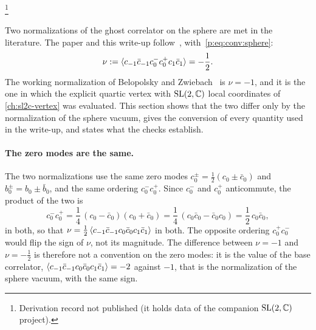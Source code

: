 \footnote{Derivation record not published (it holds data of the companion $\mathrm{SL}(2, \mathbb{C})$ project).}

Two normalizations of the ghost correlator on the sphere are met in the literature.
The paper and this write-up follow~\cite{Erbin:2021:StringFieldTheory}, with~\eqref{p:eq:conv:sphere}:
\begin{equation}
  \label{eq:conv:nu-book}
  \nu
    := \braket{c_{-1} \bar c_{-1} c_0^- c_0^+ c_1 \bar c_1}
    = - \frac{1}{2}.
\end{equation}
The working normalization of Belopolsky and Zwiebach~\cite{Belopolsky:1995:OffshellClosedString} is $\nu = -1$, and it is the one in which the explicit quartic vertex with $\mathrm{SL}(2, \mathbb{C})$ local coordinates of \cref{ch:sl2c-vertex} was evaluated.
This section shows that the two differ only by the normalization of the sphere vacuum, gives the conversion of every quantity used in the write-up, and states what the checks establish.

\paragraph{The zero modes are the same.}
The two normalizations use the same zero modes $c_0^\pm = \tfrac{1}{2} (c_0 \pm \bar c_0)$ and $b_0^\pm = b_0 \pm \bar b_0$, and the same ordering $c_0^- c_0^+$.
Since $c_0^-$ and $c_0^+$ anticommute, the product of the two is
\begin{equation}
  c_0^- c_0^+
    = \frac{1}{4} \, (c_0 - \bar c_0) (c_0 + \bar c_0)
    = \frac{1}{4} \, (c_0 \bar c_0 - \bar c_0 c_0)
    = \frac{1}{2} \, c_0 \bar c_0,
\end{equation}
in both, so that $\nu = \tfrac{1}{2} \braket{c_{-1} \bar c_{-1} c_0 \bar c_0 c_1 \bar c_1}$ in both.
The opposite ordering $c_0^+ c_0^-$ would flip the sign of $\nu$, not its magnitude.
The difference between $\nu = -1$ and $\nu = -\tfrac{1}{2}$ is therefore not a convention on the zero modes: it is the value of the base correlator, $\braket{c_{-1} \bar c_{-1} c_0 \bar c_0 c_1 \bar c_1} = -2$ against $-1$, that is the normalization of the sphere vacuum, with the same sign.


